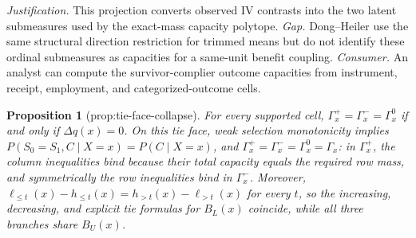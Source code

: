 \documentclass{article}
\newtheorem{proposition}{Proposition}
\begin{document}
\par\smallskip\noindent \textit{Justification.} This projection converts observed IV contrasts into the two latent submeasures used by the exact-mass capacity polytope. \textit{Gap.} Dong--Heiler use the same structural direction restriction for trimmed means but do not identify these ordinal submeasures as capacities for a same-unit benefit coupling. \textit{Consumer.} An analyst can compute the survivor-complier outcome capacities from instrument, receipt, employment, and categorized-outcome cells.

\begin{proposition}[prop:tie-face-collapse]\label{prop:tie-face-collapse}
For every supported cell, \(\Gamma_x^{+}=\Gamma_x^{-}=\Gamma_x^{0}\) if and only if \(\Delta q(x)=0\). On this tie face, weak selection monotonicity implies \(P(S_0=S_1,C\mid X=x)=P(C\mid X=x)\), and \(\Gamma_x^{+}=\Gamma_x^{-}=\Gamma_x^{0}=\Gamma_x\): in \(\Gamma_x^{+}\), the column inequalities bind because their total capacity equals the required row mass, and symmetrically the row inequalities bind in \(\Gamma_x^{-}\). Moreover, \(\ell_{\le t}(x)-h_{\le t}(x)=h_{>t}(x)-\ell_{>t}(x)\) for every \(t\), so the increasing, decreasing, and explicit tie formulas for \(B_L(x)\) coincide, while all three branches share \(B_U(x)\).
\end{proposition}
\end{document}
